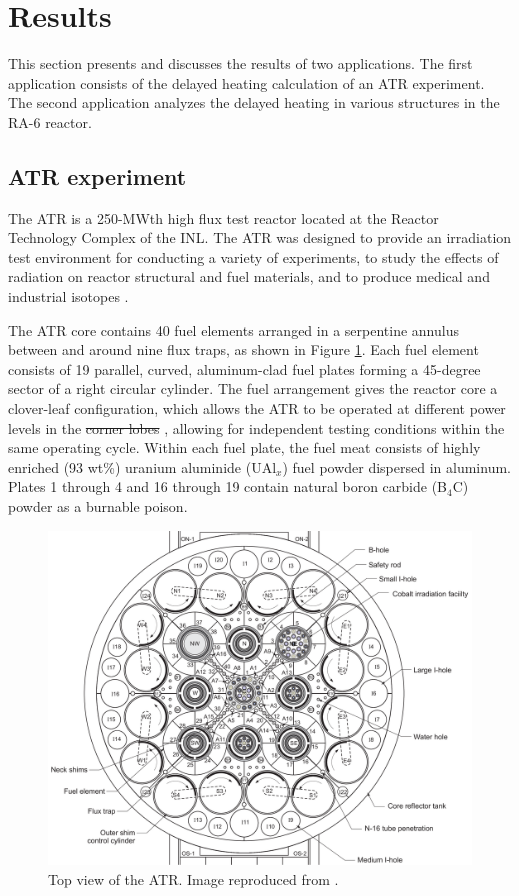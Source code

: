 \documentclass{style/nseJournal}
\providecommand{\DIFadd}[1]{{\protect\color{blue}\uwave{#1}}} %
\providecommand{\DIFdel}[1]{{\protect\color{red}\sout{#1}}}                      %
\providecommand{\DIFaddbegin}{} %
\providecommand{\DIFaddend}{} %
\providecommand{\DIFdelbegin}{} %
\providecommand{\DIFdelend}{} %
\begin{document}
\section{Results}
\label{sec:results}

This section presents and discusses the results of two applications.
The first application consists of the delayed heating calculation of an ATR experiment.
The second application analyzes the delayed heating in various structures in the RA-6 reactor.


\subsection{ATR experiment}

The \gls*{ATR} is a 250-MWth high flux test reactor located at the Reactor Technology Complex of the \gls*{INL}.
The ATR was designed to provide an irradiation test environment for conducting a variety of experiments, to study the effects of radiation on reactor structural and fuel materials, and to produce medical and industrial isotopes \cite{ICSBEP, tomberlin_advanced_2002}.

The ATR core contains 40 fuel elements arranged in a serpentine annulus between and around nine flux traps, as shown in Figure \ref{fig:atr}.
Each fuel element consists of 19 parallel, curved, aluminum-clad fuel plates forming a 45-degree sector of a right circular cylinder.
The fuel arrangement gives the reactor core a clover-leaf configuration, which allows the \gls*{ATR} to be operated at different power levels in the \DIFdelbegin \DIFdel{corner lobes }\DIFdelend \DIFaddbegin \DIFadd{five lobes (NW, NE, C, SW, SE)}\DIFaddend , allowing for independent testing conditions within the same operating cycle.
Within each fuel plate, the fuel meat consists of highly enriched (93 wt\%) uranium aluminide (UAl$_x$) fuel powder dispersed in aluminum.
Plates 1 through 4 and 16 through 19 contain natural boron carbide (B$_4$C) powder as a burnable poison.

\begin{figure}[htbp!] %
    \centering
    \includegraphics[width=0.90\linewidth]{figures/atr2}
    \hfill
    \caption{Top view of the ATR. Image reproduced from \cite{ICSBEP}.}
    \label{fig:atr}
\end{figure}
\end{document}
